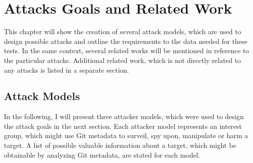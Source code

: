\chapter{Attacks Goals and Related Work}\label{related-work}
This chapter will show the creation of several attack models, which are used to design possible attacks and outline the requirements to the data needed for these tests.
In the same context, several related works will be mentioned in reference to the particular attacks.
Additional related work, which is not directly related to any attacks is listed in a separate section.


\section{Attack Models}\label{attack-models}
In the following, I will present three attacker models, which were used to design the attack goals in the next section.
Each attacker model represents an interest group, which might use Git metadata to surveil, spy upon, manipulate or harm a target.
A list of possible valuable information about a target, which might be obtainable by analyzing Git metadata, are stated for each model.


